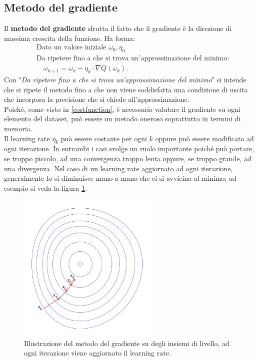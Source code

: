 \subsection{Metodo del gradiente \cite{ruder_2022}}
Il \textbf{metodo del gradiente} sfrutta il fatto che il gradiente è la direzione di massima crescita della funzione. Ha forma:
\begin{align*}
    &\text{Dato un valore iniziale }\omega_0, \eta_0\\
    &\text{Da ripetere fino a che si trova un'approssimazione del minimo:}\\
    &\quad \omega_{k+1}=\omega_k - \eta_k\cdot \nabla Q(\omega_k).
\end{align*}
Con "\textit{Da ripetere fino a che si trova un'approssimazione del minimo}" si intende che si ripete il metodo fino a che non viene soddisfatta una condizione di uscita che incorpora la precisione che si chiede all'approssimazione.\\
Poiché, come visto in \ref{costfunction}, è necessario valutare il gradiente su ogni elemento del dataset, può essere un metodo oneroso soprattutto in termini di memoria.\\
Il learning rate $\eta_k$ può essere costante per ogni $k$ oppure può essere modificato ad ogni iterazione. In entrambi i casi svolge un ruolo importante poiché può portare, se troppo piccolo, ad una convergenza troppo lenta oppure, se troppo grande, ad una divergenza. Nel caso di un learning rate aggiornato ad ogni iterazione, generalmente lo si diminuisce mano a mano che ci si avvicina al minimo; ad esempio si veda la figura \ref{gradientDescentImage}.

\begin{figure}[h]
    \centering
    \includegraphics[width=0.6\textwidth]{images/Training (teoria)/Gradient descend.png}
    \caption{Illustrazione del metodo del gradiente su degli insiemi di livello, ad ogni iterazione viene aggiornato il learning rate.\cite{wiki:gradientDescend}}
    \label{gradientDescentImage}
\end{figure}



